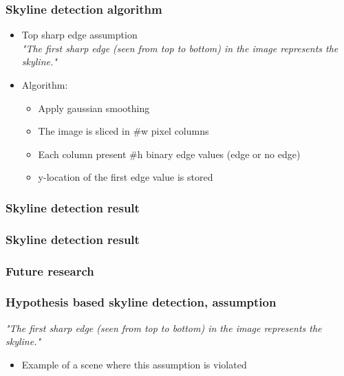 \documentclass{beamer}
\begin{document}
\frame
{
	\frametitle{Skyline detection algorithm}%
	\begin{itemize}
		\item <+-| alert@+> Top sharp edge assumption\\
		\emph{"The first sharp edge (seen from top to bottom) in the image represents the skyline."}
		\item <+-| alert@+> Algorithm:
			\begin{itemize}
			\item <+-| alert@+> Apply gaussian smoothing
			\item <+-| alert@+> The image is sliced in \#w pixel columns
			\item <+-| alert@+> Each column present \#h binary edge values (edge or no edge)
			\item <+-| alert@+> y-location of the first edge value is stored 
			\end{itemize}
	\end{itemize}
}



\frame
{
	\frametitle{Skyline detection result}%
}

\frame
{
	\frametitle{Skyline detection result}%
}

\frame
{
	\frametitle{Future research}
}

\frame
{
	\frametitle{Hypothesis based skyline detection, assumption}
	\emph{"The first sharp edge (seen from top to bottom) in the image represents the skyline."}
	\begin{itemize}
	\item <+-| alert@+> Example of a scene where this assumption is violated
	\end{itemize}
}
\end{document}
